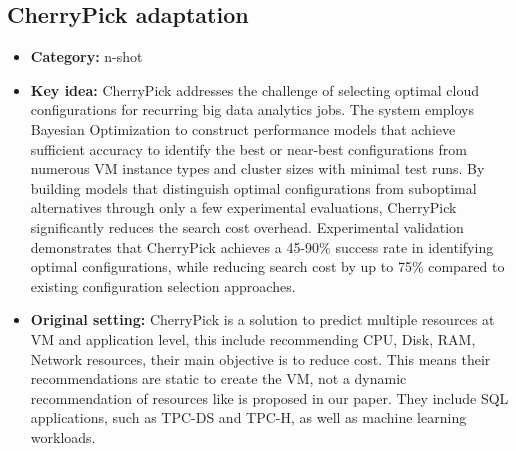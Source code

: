 \subsection{CherryPick adaptation}

\begin{itemize}
    \item \textbf{Category:} n-shot
    \item \textbf{Key idea:} CherryPick addresses the challenge of selecting optimal cloud configurations for recurring big data analytics jobs. The system employs Bayesian Optimization to construct performance models that achieve sufficient accuracy to identify the best or near-best configurations from numerous VM instance types and cluster sizes with minimal test runs. By building models that distinguish optimal configurations from suboptimal alternatives through only a few experimental evaluations, CherryPick significantly reduces the search cost overhead. Experimental validation demonstrates that CherryPick achieves a 45-90\% success rate in identifying optimal configurations, while reducing search cost by up to 75\% compared to existing configuration selection approaches.
    \item \textbf{Original setting:} CherryPick is a solution to predict multiple resources at VM and application level, this include recommending CPU, Disk, RAM, Network resources, their main objective is to reduce cost. This means their recommendations are static to create the VM, not a dynamic recommendation of resources like is proposed in our paper. They include SQL applications, such as TPC-DS and TPC-H, as well as machine learning workloads.

\end{itemize}
